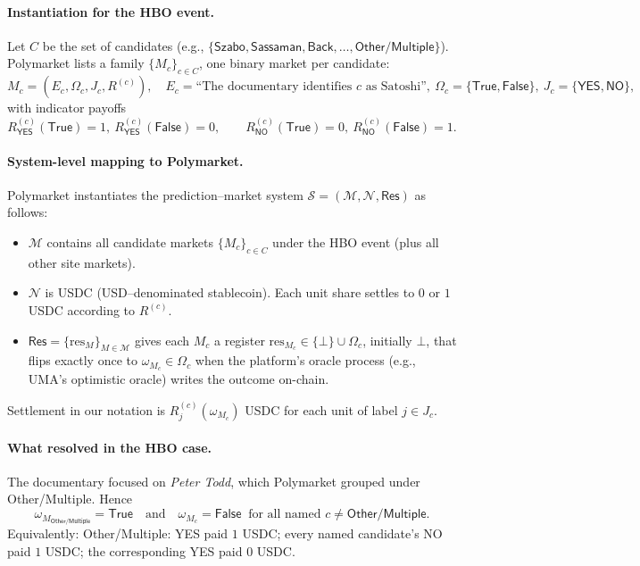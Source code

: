 \paragraph{Instantiation for the HBO event.}
Let $C$ be the set of candidates (e.g., $\{\textsf{Szabo},\textsf{Sassaman},\textsf{Back},\dots,\textsf{Other/Multiple}\}$).
Polymarket lists a family $\{M_c\}_{c\in C}$, one binary market per candidate:
\[
  M_c=(E_c,\Omega_c,J_c,R^{(c)}),\quad
  E_c=\text{``The documentary identifies $c$ as Satoshi''},\ 
  \Omega_c=\{\mathsf{True},\mathsf{False}\},\
  J_c=\{\textsf{YES},\textsf{NO}\},
\]
with indicator payoffs
\[
  R^{(c)}_{\textsf{YES}}(\mathsf{True})=1,\ R^{(c)}_{\textsf{YES}}(\mathsf{False})=0,\qquad
  R^{(c)}_{\textsf{NO}}(\mathsf{True})=0,\ R^{(c)}_{\textsf{NO}}(\mathsf{False})=1.
\]

\paragraph{System-level mapping to Polymarket.}
Polymarket instantiates the prediction–market system $\mathcal{S}=(\mathcal{M},\mathcal{N},\mathsf{Res})$ as follows:
\begin{itemize}
  \item $\mathcal{M}$ contains all candidate markets $\{M_c\}_{c\in C}$ under the HBO event (plus all other site markets).
  \item $\mathcal{N}$ is USDC (USD–denominated stablecoin). Each unit share settles to $0$ or $1$ USDC according to $R^{(c)}$.
  \item $\mathsf{Res}=\{\mathrm{res}_{M}\}_{M\in\mathcal{M}}$ gives each $M_c$ a register $\mathrm{res}_{M_c}\in\{\bot\}\cup\Omega_c$,
        initially $\bot$, that flips exactly once to $\omega_{M_c}\in\Omega_c$ when the platform’s oracle process (e.g., UMA’s optimistic oracle) writes the outcome on-chain.
\end{itemize}
Settlement in our notation is $R^{(c)}_j(\omega_{M_c})$ USDC for each unit of label $j\in J_c$.

\paragraph{What resolved in the HBO case.}
The documentary focused on \emph{Peter Todd}, which Polymarket grouped under \textsf{Other/Multiple}. Hence
\[
  \omega_{M_{\textsf{Other/Multiple}}}=\mathsf{True}
  \quad\text{and}\quad
  \omega_{M_c}=\mathsf{False}\ \text{ for all named }c\neq\textsf{Other/Multiple}.
\]
Equivalently: \textsf{Other/Multiple: YES} paid $1$ USDC; every named candidate’s \textsf{NO} paid $1$ USDC; the corresponding \textsf{YES} paid $0$ USDC.

